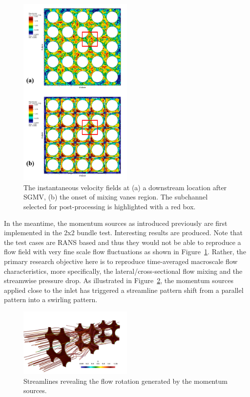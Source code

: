 \begin{figure}[!ht]
\centering
\includegraphics[width=0.5\textwidth]{./figures/LES_solutions_bundle5x5.png}
\caption{The instantaneous velocity fields at (a) a downstream location after SGMV, (b) the onset of mixing vanes region. The subchannel selected for post-processing is highlighted with a red box. }
\label{fig:velles}
\end{figure}

In the meantime, the momentum sources as introduced previously are first implemented in the 2x2 bundle test. 
Interesting results are produced. Note that the test cases are RANS based and thus they would not be able to reproduce a flow field with very fine scale flow fluctuations as shown in Figure~\ref{fig:velles}. 
Rather, the primary research objective here is to reproduce time-averaged macroscale flow characteristics, more specifically, the lateral/cross-sectional flow mixing and the streamwise pressure drop. 
As illustrated in Figure~\ref{fig:streamline}, the momentum sources applied close to the inlet has triggered a streamline pattern shift from a parallel pattern into a swirling pattern.

\begin{figure}[!ht]
\centering
\includegraphics[width=0.5\textwidth]{./figures/RANS_streamlines_bundle2x2.png}
\caption{Streamlines revealing the flow rotation generated by the momentum sources. }
\label{fig:streamline}
\end{figure}

